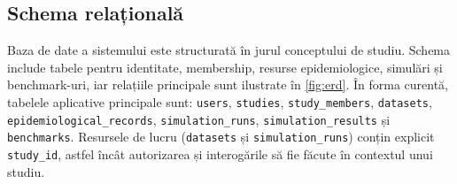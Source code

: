 \subsection{Schema relațională}
\label{subsec:schema_bd}

Baza de date a sistemului este structurată în jurul conceptului de studiu.
Schema include tabele pentru identitate, membership, resurse epidemiologice,
simulări și benchmark-uri, iar relațiile principale sunt ilustrate în
\cref{fig:erd}. În forma curentă, tabelele aplicative principale sunt:
\texttt{users}, \texttt{studies}, \texttt{study\_members},
\texttt{datasets}, \texttt{epidemiological\_records},
\texttt{simulation\_runs}, \texttt{simulation\_results} și
\texttt{benchmarks}. Resursele de lucru (\texttt{datasets} și
\texttt{simulation\_runs}) conțin explicit \texttt{study\_id}, astfel încât
autorizarea și interogările să fie făcute în contextul unui studiu.


